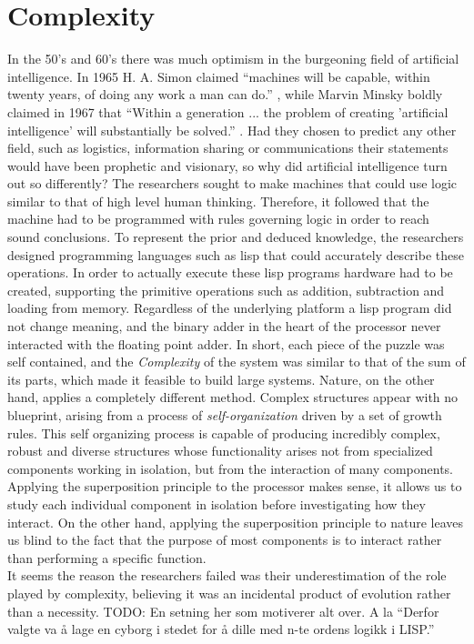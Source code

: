 \section{Complexity}
In the 50's and 60's there was much optimism in the burgeoning field of
artificial intelligence. In 1965 H. A. Simon claimed ``machines will be capable,
within twenty years, of doing any work a man can
do.''\cite{vardi_artificial_nodate} , while Marvin Minsky boldly claimed in 1967
that ``Within a generation ... the problem of creating 'artificial intelligence'
will substantially be solved.'' \cite{noauthor_marvin_nodate}.
Had they chosen to predict any other field, such as logistics, information
sharing or communications their statements would have been prophetic and
visionary, so why did artificial intelligence turn out so differently?
%
The researchers sought to make machines that could use logic similar to that of
high level human thinking.
%
Therefore, it followed that the machine had to be programmed with rules
governing logic in order to reach sound conclusions.
%
To represent the prior and deduced knowledge, the researchers designed
programming languages such as lisp that could accurately describe these
operations.
%
In order to actually execute these lisp programs hardware had to be created,
supporting the primitive operations such as addition, subtraction and loading
from memory.
%
Regardless of the underlying platform a lisp program did not change meaning, and
the binary adder in the heart of the processor never interacted with the
floating point adder. In short, each piece of the puzzle was self contained,
and the \emph{Complexity} of the system was similar to that of the sum of its
parts, which made it feasible to build large systems.
%
Nature, on the other hand, applies a completely different method.
Complex structures appear with no blueprint, arising from a process of
\emph{self-organization} driven by a set of growth rules. This self organizing
process is capable of producing incredibly complex, robust and diverse
structures whose functionality arises not from specialized components working in
isolation, but from the interaction of many components.
%
Applying the superposition principle to the processor makes sense, it allows us
to study each individual component in isolation before investigating how they
interact.
%
On the other hand, applying the superposition principle to nature leaves us
blind to the fact that the purpose of most components is to interact rather than
performing a specific function.\\
It seems the reason the researchers failed was their underestimation of the role
played by complexity, believing it was an incidental product of evolution rather
than a necessity.
TODO: En setning her som motiverer alt over. A la ``Derfor valgte va å lage en
cyborg i stedet for å dille med n-te ordens logikk i LISP.''

